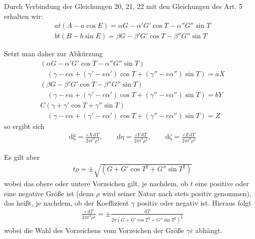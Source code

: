 \begingroup
\renewcommand{\arraystretch}{1.45}

Durch Verbindung der Gleichungen 20, 21, 22 mit den Gleichungen des Art. 5 erhalten wir:
\[
\begin{aligned}
&at(A-a\cos E)=\alpha G-\alpha'G'\cos T-\alpha''G''\sin T\\[8pt]
&bt(B-b\sin E)=\beta G-\beta'G'\cos T-\beta''G''\sin T
\end{aligned}
\]
\par Setzt man daher zur Abkürzung
\[
\begin{aligned}
&(\alpha G-\alpha'G'\cos T-\alpha''G''\sin T)\\[8pt]
&\quad(\gamma-e\alpha+(\gamma'-e\alpha')\cos T+(\gamma''-e\alpha'')\sin T)=aX\\[8pt]
&(\beta G-\beta'G'\cos T-\beta''G''\sin T)\\[8pt]
&\quad(\gamma-e\alpha+(\gamma'-e\alpha')\cos T+(\gamma''-e\alpha'')\sin T)=bY\\[8pt]
&C(\gamma+\gamma'\cos T+\gamma''\sin T)\\[8pt]
&\quad(\gamma-e\alpha+(\gamma'-e\alpha')\cos T+(\gamma''-e\alpha'')\sin T)=Z
\end{aligned}
\]
so ergibt sich
\[
\begin{aligned}
&\mathrm d\xi=\frac{\varepsilon X\,\mathrm dT}{2\pi t^3\rho^3},\qquad
\mathrm d\eta=\frac{\varepsilon Y\,\mathrm dT}{2\pi t^3\rho^3},\qquad
\mathrm d\zeta=\frac{\varepsilon Z\,\mathrm dT}{2\pi t^3\rho^3}
\end{aligned}
\]
\par Es gilt aber
\[
\begin{aligned}
&t\rho=\pm\surd{(G+G'\cos T^2+G''\sin T^2)}
\end{aligned}
\]
wobei das obere oder untere Vorzeichen gilt, je nachdem, ob $t$ eine positive oder eine negative Größe ist (denn $\rho$ wird seiner Natur nach stets positiv genommen), das heißt, je nachdem, ob der Koeffizient $\gamma$ positiv oder negativ ist. Hieraus folgt
\[
\begin{aligned}
&\frac{\varepsilon\,\mathrm dT}{2\pi t^3\rho^3}
=\pm\frac{\mathrm dT}{2\pi(G+G'\cos T^2+G''\sin T^2)^{\frac32}}
\end{aligned}
\]
wobei die Wahl des Vorzeichens vom Vorzeichen der Größe $\gamma\varepsilon$ abhängt.

